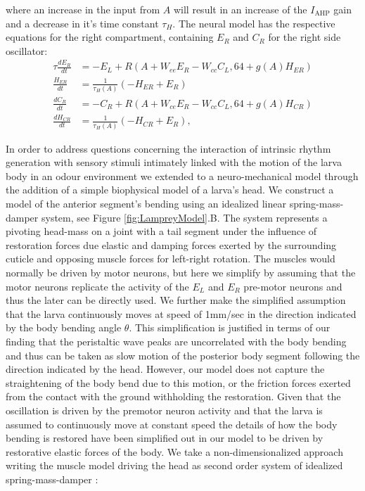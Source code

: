 \documentclass[10pt,a4paper]{article}
\begin{document}
where an increase in the input from $A$ will result in an increase of the $I_{\text{AHP}}$ gain and a decrease in it's time constant $\tau_H$.
 The neural model has the respective equations for the right compartment, containing  $E_R$ and $C_R$ for the right side oscillator:
\begin{align}
\tau \frac{dE_R}{dt} & = - E_L +  R( A + W_{ee} E_R - W_{cc}C_L, 64 + g(A)H_{ER})\\
\frac{H_{ER}}{dt} &= \frac{1}{\tau_H(A)}(-H_{ER}+E_R)\\
\frac{dC_R}{dt} &= -C_R + R( A + W_{ce}E_R - W_{cc}C_L, 64+g(A)H_{CR})\\
\frac{dH_{CR}}{dt} &= \frac{1}{\tau_H(A)}(-H_{CR}+E_R),
\end{align}

In order to address questions concerning the interaction of intrinsic rhythm generation with sensory stimuli intimately linked with the motion of the larva body in an odour environment we extended to a neuro-mechanical model through the addition of a simple biophysical model of a larva's head. We construct a model of the anterior segment's bending using an idealized linear spring-mass-damper system, see Figure \ref{fig:LampreyModel}.B. The system represents a pivoting head-mass on a joint with a tail segment under the influence of restoration forces due elastic and damping forces exerted by the surrounding cuticle and opposing muscle forces for left-right rotation. The muscles would normally be driven by motor neurons, but here we simplify by assuming that the motor neurons replicate the activity of the $E_L$ and $E_R$ pre-motor neurons and thus the later can be directly used.
We further make the simplified assumption that the larva continuously moves at speed of 1mm/sec in the direction indicated by the body bending angle $\theta$. This simplification is justified in terms of our finding that the peristaltic wave peaks are uncorrelated with the body bending and thus can be taken as slow motion of the posterior body segment following the direction indicated by the head. However, our model does not capture the straightening of the body bend due to this motion, or the friction forces exerted from the contact with the ground withholding the restoration. Given that the oscillation is driven by the premotor neuron activity and that the larva is assumed to continuously move at constant speed the details of how the body bending is restored have been simplified out in our model to be driven by restorative elastic forces of the body. 
 We take a non-dimensionalized approach writing the muscle model driving the head as second order system of idealized spring-mass-damper \cite[see][]{fung2013biomechanics}:
\end{document}
